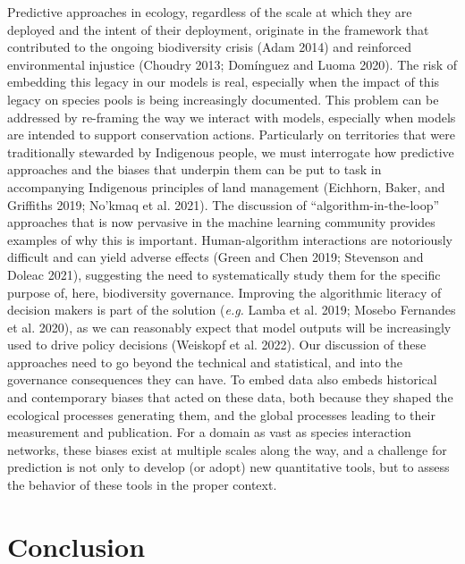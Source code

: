 \documentclass[
  letterpaper,
  DIV=11,
  numbers=noendperiod]{scrartcl}
\begin{document}
Predictive approaches in ecology, regardless of the scale at which they
are deployed and the intent of their deployment, originate in the
framework that contributed to the ongoing biodiversity crisis (Adam
2014) and reinforced environmental injustice (Choudry 2013; Domínguez
and Luoma 2020). The risk of embedding this legacy in our models is
real, especially when the impact of this legacy on species pools is
being increasingly documented. This problem can be addressed by
re-framing the way we interact with models, especially when models are
intended to support conservation actions. Particularly on territories
that were traditionally stewarded by Indigenous people, we must
interrogate how predictive approaches and the biases that underpin them
can be put to task in accompanying Indigenous principles of land
management (Eichhorn, Baker, and Griffiths 2019; No'kmaq et al. 2021).
The discussion of ``algorithm-in-the-loop'' approaches that is now
pervasive in the machine learning community provides examples of why
this is important. Human-algorithm interactions are notoriously
difficult and can yield adverse effects (Green and Chen 2019; Stevenson
and Doleac 2021), suggesting the need to systematically study them for
the specific purpose of, here, biodiversity governance. Improving the
algorithmic literacy of decision makers is part of the solution
(\emph{e.g.} Lamba et al. 2019; Mosebo Fernandes et al. 2020), as we can
reasonably expect that model outputs will be increasingly used to drive
policy decisions (Weiskopf et al. 2022). Our discussion of these
approaches need to go beyond the technical and statistical, and into the
governance consequences they can have. To embed data also embeds
historical and contemporary biases that acted on these data, both
because they shaped the ecological processes generating them, and the
global processes leading to their measurement and publication. For a
domain as vast as species interaction networks, these biases exist at
multiple scales along the way, and a challenge for prediction is not
only to develop (or adopt) new quantitative tools, but to assess the
behavior of these tools in the proper context.

\hypertarget{conclusion}{%
\section{Conclusion}\label{conclusion}}
\end{document}
